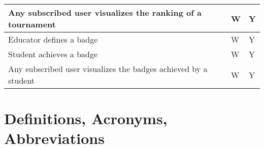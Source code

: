 \begin{center}
\begin{longtable}{|p{8.7cm}|p{3cm}|p{3cm}|}
        Any subscribed user visualizes the ranking of a tournament                                                                            & W                      & Y               \\ \hline
        Educator defines a badge                                                                                                              & W                      & Y               \\ \hline
        Student achieves a badge                                                                                                              & W                      & Y               \\ \hline
        Any subscribed user visualizes the badges achieved by a student                                                                       & W                      & Y               \\ \hline
    \end{longtable}
\end{center}


\section{Definitions, Acronyms, Abbreviations}

